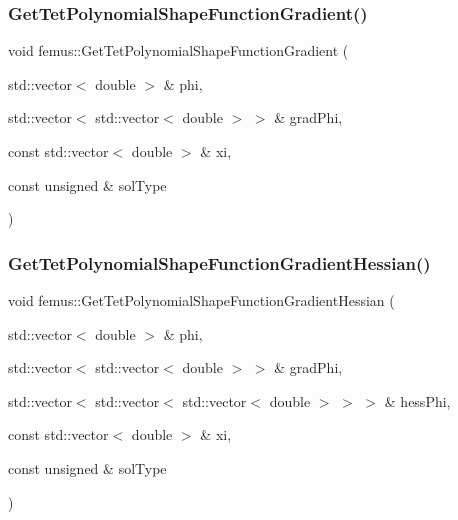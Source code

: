 \subsubsection{\texorpdfstring{Get\+Tet\+Polynomial\+Shape\+Function\+Gradient()}{GetTetPolynomialShapeFunctionGradient()}}
{\footnotesize\ttfamily void femus\+::\+Get\+Tet\+Polynomial\+Shape\+Function\+Gradient (\begin{DoxyParamCaption}\item[{std\+::vector$<$ double $>$ \&}]{phi,  }\item[{std\+::vector$<$ std\+::vector$<$ double $>$ $>$ \&}]{grad\+Phi,  }\item[{const std\+::vector$<$ double $>$ \&}]{xi,  }\item[{const unsigned \&}]{sol\+Type }\end{DoxyParamCaption})}

\mbox{\label{namespacefemus_aa8fa3f5190981a28b13ad12b68ec7119}} 
\subsubsection{\texorpdfstring{Get\+Tet\+Polynomial\+Shape\+Function\+Gradient\+Hessian()}{GetTetPolynomialShapeFunctionGradientHessian()}}
{\footnotesize\ttfamily void femus\+::\+Get\+Tet\+Polynomial\+Shape\+Function\+Gradient\+Hessian (\begin{DoxyParamCaption}\item[{std\+::vector$<$ double $>$ \&}]{phi,  }\item[{std\+::vector$<$ std\+::vector$<$ double $>$ $>$ \&}]{grad\+Phi,  }\item[{std\+::vector$<$ std\+::vector$<$ std\+::vector$<$ double $>$ $>$ $>$ \&}]{hess\+Phi,  }\item[{const std\+::vector$<$ double $>$ \&}]{xi,  }\item[{const unsigned \&}]{sol\+Type }\end{DoxyParamCaption})}

\mbox{\label{namespacefemus_a7b644f5f847656f51ce364a2d101a5d8}} 
